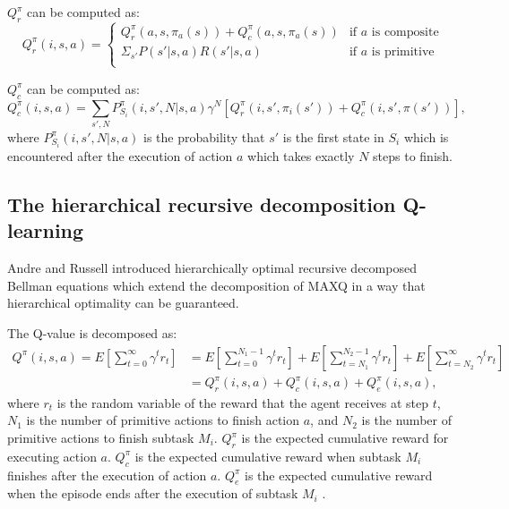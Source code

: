$Q_r^{\pi}$ can be computed as:
\begin{equation}
    Q_r^{\pi}(i, s, a) = 
    \left\{\begin{array}{ll}
        Q_r^{\pi}(a, s, \pi_a(s)) + Q_c^{\pi}(a, s, \pi_a(s))& \mbox{if $a$ is composite} \\
        \Sigma_{s'} P(s'|s, a)R(s'|s, a) & \mbox{if $a$ is primitive} \\  
    \end{array} \right.
\end{equation}

$Q_c^{\pi}$ can be computed as:
\begin{equation}
    Q_c^{\pi}(i, s, a) = \sum_{s', N} P_{S_i}^{\pi}(i, s', N|s, a)\gamma^N[Q_r^{\pi}(i, s', \pi_i(s')) + Q_c^{\pi}(i, s', \pi(s'))],
\end{equation}
where $P_{S_i}^{\pi}(i, s', N|s, a)$ is the probability that $s'$ is the first state in $S_i$ which
is encountered after the execution of action $a$ which takes exactly $N$ steps to finish. 

\subsection{The hierarchical recursive decomposition Q-learning}

Andre and Russell \cite{HORDQ} introduced hierarchically optimal recursive decomposed Bellman equations
which extend the decomposition of MAXQ in a way that hierarchical optimality can be guaranteed.

The Q-value is decomposed as:
\begin{align}
    Q^{\pi}(i, s, a) = E[\sum_{t=0}^{\infty}\gamma^t r_t] &= E[\sum_{t=0}^{N_1 - 1}\gamma^t r_t] + E[\sum_{t=N_1}^{N_2 - 1}\gamma^t r_t] + E[\sum_{t=N_2}^{\infty}\gamma^t r_t]\\
                    &= Q_r^{\pi}(i, s, a) + Q_c^{\pi}(i, s, a) + Q_e^{\pi}(i, s, a),
\end{align}
where $r_t$ is the random variable of the reward that the agent receives at step $t$, $N_1$ is the number of primitive actions to finish action $a$, 
and $N_2$ is the number of primitive actions 
to finish subtask $M_i$. $ Q_r^{\pi}$ is the expected cumulative reward for executing action $a$.
$Q_c^{\pi}$ is the expected cumulative reward when subtask $M_i$ finishes after the execution of action $a$. 
$Q_e^{\pi}$ is the expected cumulative reward when the episode ends after the execution of subtask $M_i$ .

